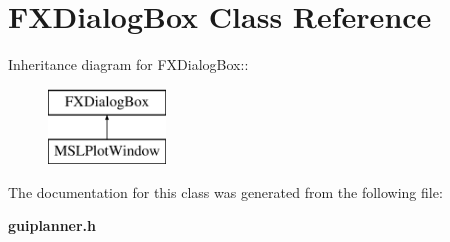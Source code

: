 \section{FXDialog\-Box  Class Reference}
\label{class_FXDialogBox}
Inheritance diagram for FXDialog\-Box::\begin{figure}[H]
\begin{center}
\leavevmode
\includegraphics[height=2cm]{class_FXDialogBox}
\end{center}
\end{figure}


The documentation for this class was generated from the following file:\begin{CompactItemize}
\item 
{\bf guiplanner.h}\end{CompactItemize}

